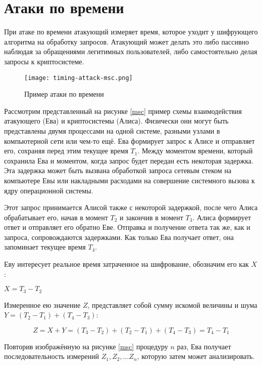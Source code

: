\section{Атаки по времени} \label{sec:timing}

При атаке по времени атакующий измеряет время, которое уходит у шифрующего
алгоритма на обработку запросов. Атакующий может делать это либо пассивно
наблюдая за обращениями легитимных пользователей, либо самостоятельно делая
запросы к криптосистеме.

\begin{figure}[h]
    \centering
    \texttt{[image: timing-attack-msc.png]}
    \caption{Пример атаки по времени}
\end{figure} \label{fig:msc}

Рассмотрим представленный на рисунке \ref{msc} пример схемы взаимодействия атакующего (Ева)
и криптосистемы (Алиса). Физически они могут быть представлены двумя процессами на одной
системе, разными узлами в компьютерной сети или чем-то ещё. Ева формирует запрос
к Алисе и отправляет его, сохраняя перед этим текущее время $T_1$. Между
моментом времени, который сохранила Ева и моментом, когда запрос будет передан
есть некоторая задержка. Эта задержка может быть вызвана обработкой запроса
сетевым стеком на компьютере Евы или накладными расходами на совершение системного
вызова к ядру операционной системы. 

Этот запрос принимается Алисой также с некоторой задержкой, после чего Алиса
обрабатывает его, начав в момент $T_2$ и закончив в момент $T_3$. Алиса
формирует ответ и отправляет его обратно Еве. Отправка и получение ответа так же,
как и запроса, сопровождаются задержками. Как только Ева получает ответ, она
запоминает текущее время $T_4$.

Еву интересует реальное время затраченное на шифрование, обозначим его как $X$ :

$X = T_3 - T_2$

Измеренное ею значение $Z$, представляет собой сумму искомой величины и шума
$Y = (T_2 - T_1) + (T_4 - T_3)$:

\begin{equation}
Z = X + Y = (T_3 - T_2) + (T_2 - T_1) + (T_4 - T_3) = T_4 - T_1
\end{equation} \label{eq:noise}

Повторив изображённую на рисунке \ref{msc} процедуру $n$ раз, Ева получает
последовательность измерений ${Z_1, Z_2, ... Z_n}$, которую затем может анализировать.

